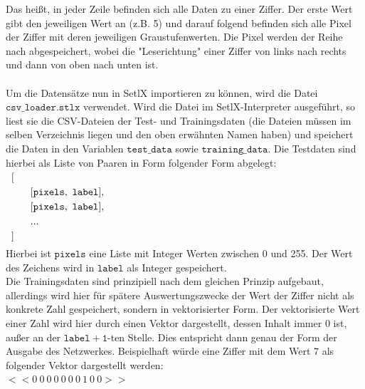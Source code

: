 Das heißt, in jeder Zeile befinden sich alle Daten zu einer Ziffer. Der erste Wert gibt den jeweiligen Wert an (z.B. 5) und darauf folgend befinden sich alle Pixel der Ziffer mit deren jeweiligen Graustufenwerten. Die Pixel werden der Reihe nach abgespeichert, wobei die "Leserichtung" einer Ziffer von links nach rechts und dann von oben nach unten ist.\\ \\
Um die Datensätze nun in SetlX importieren zu können, wird die Datei $\mathtt{csv\_loader.stlx}$ verwendet. Wird die Datei im SetlX-Interpreter ausgeführt, so liest sie die CSV-Dateien der Test- und Trainingsdaten (die Dateien müssen im selben Verzeichnis liegen und den oben erwähnten Namen haben) und speichert die Daten in den Variablen $\mathtt{test\_data}$ sowie $\mathtt{training\_data}$. Die Testdaten sind hierbei als Liste von Paaren in Form folgender Form abgelegt: \\
\hspace*{0.3cm}
$
\begin{array}[t]{lcll}
	[ \\[0.1cm]
	
	\hspace*{0.5cm}
	\begin{array}[t]{lcll}
    	[\mathtt{pixels},\ \mathtt{label}], \\[0.1cm]
    	[\mathtt{pixels},\ \mathtt{label}], \\[0.1cm]
    	... \\[0.1cm]
    \end{array}
    \\[0.1cm]
    
    ] \\[0.1cm]
\end{array}
$
\\[0.0cm]

\noindent
Hierbei ist $\mathtt{pixels}$ eine Liste mit Integer Werten zwischen 0 und 255. Der Wert des Zeichens wird in $\mathtt{label}$ als Integer gespeichert. \\ 
Die Trainingsdaten sind prinzipiell nach dem gleichen Prinzip aufgebaut, allerdings wird hier für spätere Auswertungszwecke der Wert der Ziffer nicht als konkrete Zahl gespeichert, sondern in vektorisierter Form. Der vektorisierte Wert einer Zahl wird hier durch einen Vektor dargestellt, dessen Inhalt immer 0 ist, außer an der $\mathtt{label+1}$-ten Stelle. Dies entspricht dann genau der Form der Ausgabe des Netzwerkes. Beispielhaft würde eine Ziffer mit dem Wert $7$ als folgender Vektor dargestellt werden: \\
$<<0\ 0\ 0\ 0\ 0\ 0\ 0\ 1\ 0\ 0>>$ \\

